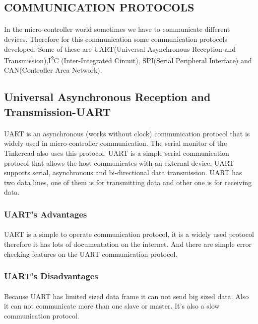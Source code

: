 \documentclass[pdftex,12pt,a4paper]{article}
\begin{document}
\begin{flushleft}
\newpage
\section{COMMUNICATION PROTOCOLS}
\paragraph{}
In the micro-controller world sometimes we have to communicate different devices. Therefore for this communication some communication protocols developed. Some of these are UART(Universal Asynchronous Reception and Transmission),I\textsuperscript{2}C (Inter-Integrated Circuit), SPI(Serial Peripheral Interface) and CAN(Controller Area Network).

\subsection{Universal Asynchronous Reception and Transmission-UART}
\paragraph{}
UART is an asynchronous (works without clock) communication protocol that is widely used in micro-controller communication. The serial monitor of the Tinkercad also uses this protocol. UART is a simple serial communication protocol that allows the host communicates with an external device. UART supports serial, asynchronous and bi-directional data transmission. UART has two data lines, one of them is for transmitting data and other one is for receiving data.
\subsubsection{UART's Advantages}
\paragraph{}
UART is a simple to operate communication protocol, it is a widely used protocol therefore it has lots of documentation on the internet. And there are simple error checking features on the UART communication protocol.

\subsubsection{UART's Disadvantages}
\paragraph{}
Because UART has limited sized data frame it can not send big sized data. Also it can not communicate more than one slave or master. It's also a slow communication protocol.


\end{flushleft}
\end{document}
